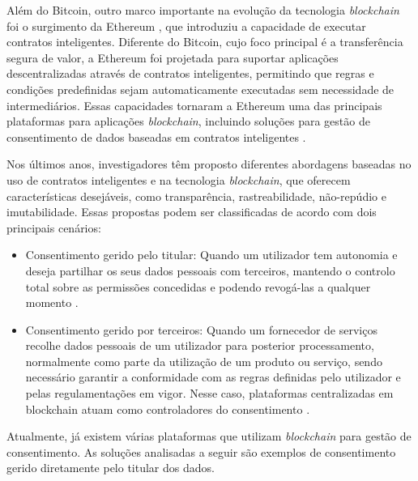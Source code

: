 Além do Bitcoin, outro marco importante na evolução da tecnologia \textit{blockchain} foi o surgimento da Ethereum \citep{buterin2014next}, que introduziu a capacidade de executar contratos inteligentes. Diferente do Bitcoin, cujo foco principal é a transferência segura de valor, a Ethereum foi projetada para suportar aplicações descentralizadas através de contratos inteligentes, permitindo que regras e condições predefinidas sejam automaticamente executadas sem necessidade de intermediários. Essas capacidades tornaram a Ethereum uma das principais plataformas para aplicações \textit{blockchain}, incluindo soluções para gestão de consentimento de dados baseadas em contratos inteligentes \citep{Frank2018}.

Nos últimos anos, investigadores têm proposto diferentes abordagens baseadas no uso de contratos inteligentes e na tecnologia \textit{blockchain}, que oferecem características desejáveis, como transparência, rastreabilidade, não-repúdio e imutabilidade. Essas propostas podem ser classificadas de acordo com dois principais cenários:

\begin{itemize}
    \item Consentimento gerido pelo titular: Quando um utilizador tem autonomia e deseja partilhar os seus dados pessoais com terceiros, mantendo o controlo total sobre as permissões concedidas e podendo revogá-las a qualquer momento \citep{Merlec2021}.
    \item Consentimento gerido por terceiros: Quando um fornecedor de serviços recolhe dados pessoais de um utilizador para posterior processamento, normalmente como parte da utilização de um produto ou serviço, sendo necessário garantir a conformidade com as regras definidas pelo utilizador e pelas regulamentações em vigor. Nesse caso, plataformas centralizadas em blockchain atuam como controladores do consentimento \citep{Aldred2019}.
\end{itemize}

Atualmente, já existem várias plataformas que utilizam \textit{blockchain} para gestão de consentimento. 
As soluções analisadas a seguir são exemplos de consentimento gerido diretamente pelo titular dos dados.

